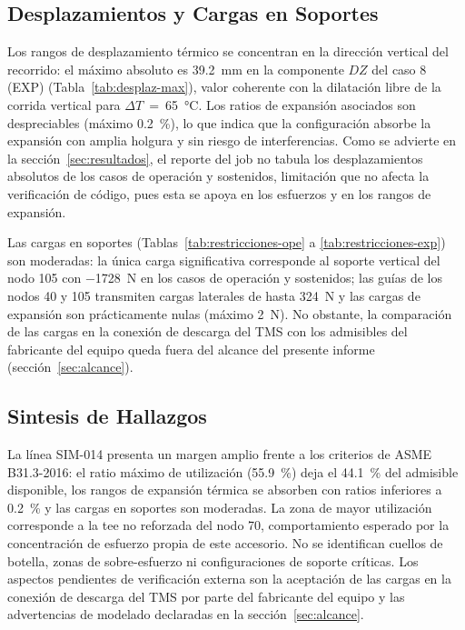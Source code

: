 \subsection{Desplazamientos y Cargas en Soportes}

Los rangos de desplazamiento t\'{e}rmico se concentran en la direcci\'{o}n
vertical del recorrido: el m\'{a}ximo absoluto es 39.2~\si{mm} en la
componente $DZ$ del caso 8 (EXP) (Tabla~\ref{tab:desplaz-max}), valor
coherente con la dilataci\'{o}n libre de la corrida vertical para
$\Delta T$~=~65~\si{\celsius}. Los ratios de expansi\'{o}n asociados son
des\-pre\-cia\-bles (m\'{a}ximo 0.2~\%), lo que indica que la configuraci\'{o}n
absorbe la expansi\'{o}n con amplia holgura y sin riesgo de interferencias.
Como se advierte en la secci\'{o}n~\ref{sec:resultados}, el reporte del job no
tabula los desplazamientos absolutos de los casos de operaci\'{o}n y
sostenidos, limitaci\'{o}n que no afecta la verificaci\'{o}n de c\'{o}digo,
pues esta se apoya en los esfuerzos y en los rangos de expansi\'{o}n.

Las cargas en soportes (Tablas~\ref{tab:restricciones-ope} a
\ref{tab:restricciones-exp}) son moderadas: la \'{u}nica carga significativa
corresponde al soporte vertical del nodo 105 con \num{-1728}~\si{N} en los
casos de operaci\'{o}n y sostenidos; las gu\'{i}as de los nodos 40 y 105
transmiten cargas laterales de hasta \num{324}~\si{N} y las cargas de
expansi\'{o}n son pr\'{a}cticamente nulas (m\'{a}ximo 2~\si{N}). No obstante,
la comparaci\'{o}n de las cargas en la conexi\'{o}n de descarga del TMS con los
admisibles del fabricante del equipo queda fuera del alcance del presente
informe (secci\'{o}n~\ref{sec:alcance}).

\subsection{Sintesis de Hallazgos}

La l\'{i}nea SIM-014 presenta un margen amplio frente a los criterios de
ASME B31.3-2016: el ratio m\'{a}ximo de utilizaci\'{o}n (55.9~\%) deja el
44.1~\% del admisible disponible, los rangos de expansi\'{o}n t\'{e}rmica se
absorben con ratios inferiores a 0.2~\% y las cargas en soportes son
moderadas. La zona de mayor utilizaci\'{o}n corresponde a la tee no reforzada
del nodo 70, comportamiento esperado por la concentraci\'{o}n de esfuerzo
propia de este accesorio. No se identifican cuellos de botella, zonas de
sobre-esfuerzo ni configuraciones de soporte cr\'{i}ticas. Los aspectos
pendientes de verificaci\'{o}n externa son la aceptaci\'{o}n de las cargas en
la conexi\'{o}n de descarga del TMS por parte del fabricante del equipo y las
advertencias de modelado declaradas en la secci\'{o}n~\ref{sec:alcance}.
